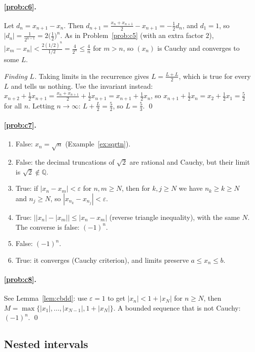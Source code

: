 \documentclass[11pt]{article}
\theoremstyle{definition}
\newcommand{\Q}{\mathbb{Q}}
\newcommand{\eps}{\varepsilon}
\begin{document}
\paragraph{\ref{prob:c6}.} Let $d_n=x_{n+1}-x_n$. Then
$d_{n+1}=\frac{x_n+x_{n+1}}2-x_{n+1}=-\frac12d_n$, and $d_1=1$, so
$|d_n|=\frac1{2^{n-1}}=2\bigl(\frac12\bigr)^n$. As in Problem~\ref{prob:c5}
(with an extra factor $2$),
$|x_m-x_n|<\frac{2(1/2)^n}{1/2}=\frac4{2^n}\le\frac4n$ for $m>n$, so
$(x_n)$ is Cauchy and converges to some $L$.

\emph{Finding $L$.} Taking limits in the recurrence gives $L=\frac{L+L}2$,
which is true for every $L$ and tells us nothing. Use the invariant instead:
$x_{n+2}+\frac12x_{n+1}=\frac{x_n+x_{n+1}}2+\frac12x_{n+1}=x_{n+1}+\frac12x_n$,
so $x_{n+1}+\frac12x_n=x_2+\frac12x_1=\frac52$ for all $n$. Letting
$n\to\infty$: $L+\frac L2=\frac52$, so $L=\frac53$. \qed

\paragraph{\ref{prob:c7}.}
\begin{enumerate}[label=(\alph*),nosep]
  \item False: $x_n=\sqrt n$ (Example~\ref{ex:sqrtn}).
  \item False: the decimal truncations of $\sqrt2$ are rational and
        Cauchy, but their limit is $\sqrt2\notin\Q$.
  \item True: if $|x_n-x_m|<\eps$ for $n,m\ge N$, then for $k,j\ge N$ we
        have $n_k\ge k\ge N$ and $n_j\ge N$, so $|x_{n_k}-x_{n_j}|<\eps$.
  \item True: $\bigl||x_n|-|x_m|\bigr|\le|x_n-x_m|$ (reverse triangle
        inequality), with the same $N$. The converse is false: $(-1)^n$.
  \item False: $(-1)^n$.
  \item True: it converges (Cauchy criterion), and limits preserve
        $a\le x_n\le b$.
\end{enumerate}

\paragraph{\ref{prob:c8}.} See Lemma~\ref{lem:cbdd}: use $\eps=1$ to get
$|x_n|<1+|x_N|$ for $n\ge N$, then
$M=\max\{|x_1|,\dots,|x_{N-1}|,1+|x_N|\}$. A bounded sequence that is
not Cauchy: $(-1)^n$. \qed

\subsection*{Nested intervals}
\end{document}
